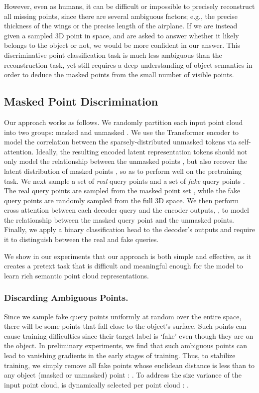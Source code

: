\documentclass[runningheads]{llncs}
\begin{document}
However, even as humans, it can be difficult or impossible to precisely reconstruct all missing points, since there are several ambiguous factors; e.g., the precise thickness of the wings or the precise length of the airplane. If we are instead given a sampled 3D point in space, and are asked to answer whether it likely belongs to the object or not, we would be more confident in our answer.  This discriminative point classification task is much less ambiguous than the reconstruction task, yet still requires a deep understanding of object semantics in order to deduce the masked points from the small number of visible points.

\subsection{Masked Point Discrimination}\label{sec:dmpm}

Our approach works as follows.  We randomly partition each input point cloud  into two groups: masked  and unmasked .  We use the Transformer encoder to model the correlation between the sparsely-distributed unmasked tokens  via self-attention.
Ideally, the resulting encoded latent representation tokens  should not only model the relationship between the unmasked points , but also recover the latent distribution of masked points , so as to perform well on the pretraining task.
We next sample a set of \emph{real} query points  and a set of \emph{fake} query points .  The real query points are sampled from the masked point set , while the fake query points are randomly sampled from the full 3D space.
We then perform cross attention between each decoder query  and the  encoder outputs, , to model the relationship between the masked query point and the unmasked points.
Finally, we apply a binary classification head to the decoder's outputs and require it to distinguish between the real and fake queries.  

We show in our experiments that our approach is both simple and effective, as it creates a pretext task that is difficult and meaningful enough for the model to learn rich semantic point cloud representations.

\vspace{-10pt}
\subsubsection{Discarding Ambiguous Points.}
\label{AmbiguousPts}
Since we sample fake query points uniformly at random over the entire space, there will be some points that fall close to the object's surface. Such points can cause training difficulties since their target label is `fake' even though they are on the object.  In preliminary experiments, we find that such ambiguous points can lead to vanishing gradients in the early stages of training.  Thus, to stabilize training, we simply remove all fake points  whose euclidean distance is less than  to any object (masked or unmasked) point : .
To address the size variance of the input point cloud,  is dynamically selected per point cloud : .
\end{document}

